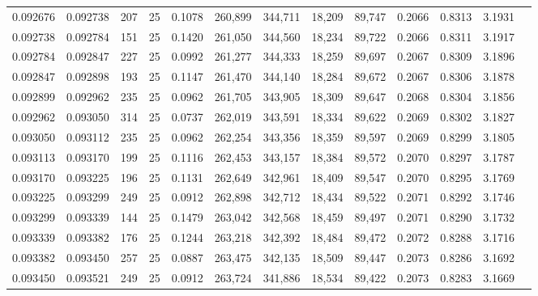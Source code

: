 \begin{tabular}{rrrrrrrrrrrrr}
0.092676 & 0.092738 &   207 &  25 &                                     0.1078 & 260,899 & 344,711 &  18,209 &  89,747 & 0.2066 & 0.8313 & 3.1931 \\
0.092738 & 0.092784 &   151 &  25 &                                     0.1420 & 261,050 & 344,560 &  18,234 &  89,722 & 0.2066 & 0.8311 & 3.1917 \\
0.092784 & 0.092847 &   227 &  25 &                                     0.0992 & 261,277 & 344,333 &  18,259 &  89,697 & 0.2067 & 0.8309 & 3.1896 \\
0.092847 & 0.092898 &   193 &  25 &                                     0.1147 & 261,470 & 344,140 &  18,284 &  89,672 & 0.2067 & 0.8306 & 3.1878 \\
0.092899 & 0.092962 &   235 &  25 &                                     0.0962 & 261,705 & 343,905 &  18,309 &  89,647 & 0.2068 & 0.8304 & 3.1856 \\
0.092962 & 0.093050 &   314 &  25 &                                     0.0737 & 262,019 & 343,591 &  18,334 &  89,622 & 0.2069 & 0.8302 & 3.1827 \\
0.093050 & 0.093112 &   235 &  25 &                                     0.0962 & 262,254 & 343,356 &  18,359 &  89,597 & 0.2069 & 0.8299 & 3.1805 \\
0.093113 & 0.093170 &   199 &  25 &                                     0.1116 & 262,453 & 343,157 &  18,384 &  89,572 & 0.2070 & 0.8297 & 3.1787 \\
0.093170 & 0.093225 &   196 &  25 &                                     0.1131 & 262,649 & 342,961 &  18,409 &  89,547 & 0.2070 & 0.8295 & 3.1769 \\
0.093225 & 0.093299 &   249 &  25 &                                     0.0912 & 262,898 & 342,712 &  18,434 &  89,522 & 0.2071 & 0.8292 & 3.1746 \\
0.093299 & 0.093339 &   144 &  25 &                                     0.1479 & 263,042 & 342,568 &  18,459 &  89,497 & 0.2071 & 0.8290 & 3.1732 \\
0.093339 & 0.093382 &   176 &  25 &                                     0.1244 & 263,218 & 342,392 &  18,484 &  89,472 & 0.2072 & 0.8288 & 3.1716 \\
0.093382 & 0.093450 &   257 &  25 &                                     0.0887 & 263,475 & 342,135 &  18,509 &  89,447 & 0.2073 & 0.8286 & 3.1692 \\
0.093450 & 0.093521 &   249 &  25 &                                     0.0912 & 263,724 & 341,886 &  18,534 &  89,422 & 0.2073 & 0.8283 & 3.1669 \\

\end{tabular}
